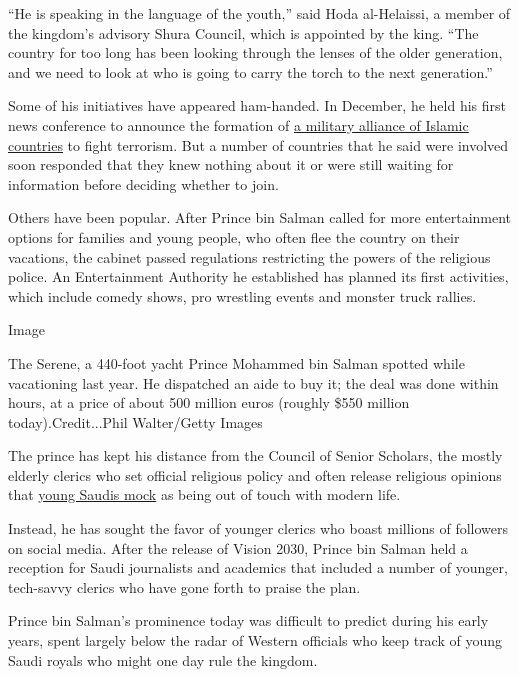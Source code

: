 ``He is speaking in the language of the youth,'' said Hoda al-Helaissi,
a member of the kingdom's advisory Shura Council, which is appointed by
the king. ``The country for too long has been looking through the lenses
of the older generation, and we need to look at who is going to carry
the torch to the next generation.''

Some of his initiatives have appeared ham-handed. In December, he held
his first news conference to announce the formation of
\href{http://www.reuters.com/article/us-saudi-security-idUSKBN0TX2PG20151215}{a
military alliance of Islamic countries} to fight terrorism. But a number
of countries that he said were involved soon responded that they knew
nothing about it or were still waiting for information before deciding
whether to join.

Others have been popular. After Prince bin Salman called for more
entertainment options for families and young people, who often flee the
country on their vacations, the cabinet passed regulations restricting
the powers of the religious police. An Entertainment Authority he
established has planned its first activities, which include comedy
shows, pro wrestling events and monster truck rallies.

Image

The Serene, a 440-foot yacht Prince Mohammed bin Salman spotted while
vacationing last year. He dispatched an aide to buy it; the deal was
done within hours, at a price of about 500 million euros (roughly \$550
million today).Credit...Phil Walter/Getty Images

The prince has kept his distance from the Council of Senior Scholars,
the mostly elderly clerics who set official religious policy and often
release religious opinions that
\href{http://www.nytimes3xbfgragh.onion/2016/01/22/world/middleeast/saudi-arabias-top-cleric-forbids-chess-but-players-maneuver.html}{young
Saudis mock} as being out of touch with modern life.

Instead, he has sought the favor of younger clerics who boast millions
of followers on social media. After the release of Vision 2030, Prince
bin Salman held a reception for Saudi journalists and academics that
included a number of younger, tech-savvy clerics who have gone forth to
praise the plan.

Prince bin Salman's prominence today was difficult to predict during his
early years, spent largely below the radar of Western officials who keep
track of young Saudi royals who might one day rule the kingdom.

